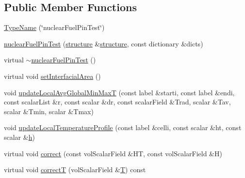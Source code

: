 \subsection*{Public Member Functions}
\begin{DoxyCompactItemize}
\item 
\hyperlink{classFoam_1_1powerModels_1_1nuclearFuelPinTest_a2cd2517e4a832c5f3cffe7ff0b706f71}{Type\+Name} (\char`\"{}nuclear\+Fuel\+Pin\+Test\char`\"{})
\item 
\hyperlink{classFoam_1_1powerModels_1_1nuclearFuelPinTest_a0fceab77e99080514ba347aa8a16fb11}{nuclear\+Fuel\+Pin\+Test} (\hyperlink{classFoam_1_1structure}{structure} \&\hyperlink{classFoam_1_1structure}{structure}, const dictionary \&dicts)
\item 
virtual \hyperlink{classFoam_1_1powerModels_1_1nuclearFuelPinTest_a969c938ab87b40a8875befeafb786839}{$\sim$nuclear\+Fuel\+Pin\+Test} ()
\item 
virtual void \hyperlink{classFoam_1_1powerModels_1_1nuclearFuelPinTest_a8fc8c05c610e629783c80688340f8db4}{set\+Interfacial\+Area} ()
\item 
void \hyperlink{classFoam_1_1powerModels_1_1nuclearFuelPinTest_a156a2a794e9317591692be62c0a33299}{update\+Local\+Avg\+Global\+Min\+MaxT} (const label \&starti, const label \&endi, const scalar\+List \&r, const scalar \&dr, const scalar\+Field \&Trad, scalar \&Tav, scalar \&Tmin, scalar \&Tmax)
\item 
void \hyperlink{classFoam_1_1powerModels_1_1nuclearFuelPinTest_aebceb9d61655d7851a7ab3a7710164ea}{update\+Local\+Temperature\+Profile} (const label \&celli, const scalar \&ht, const scalar \&\hyperlink{createFieldRefs_8H_a52f2dcc529f3c146980b0ce8dc591698}{h})
\item 
virtual void \hyperlink{classFoam_1_1powerModels_1_1nuclearFuelPinTest_a08cf6ccfed7f616074be223f0d2379f3}{correct} (const vol\+Scalar\+Field \&HT, const vol\+Scalar\+Field \&H)
\item 
virtual void \hyperlink{classFoam_1_1powerModels_1_1nuclearFuelPinTest_a9f9875fb3a22007b3cb6ef9f59821c9c}{correctT} (vol\+Scalar\+Field \&\hyperlink{EEqn__1pl_8H_ad0f94aa7ea43d4be0bae24e3a89aad0c}{T}) const
\end{DoxyCompactItemize}
